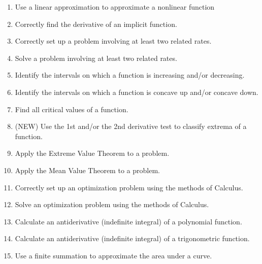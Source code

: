 \documentclass[12pt,landscape]{article}
\begin{document}
\begin{multicols}{2}
\begin{enumerate}
\item Use a linear approximation to approximate a nonlinear function\\
%
\item Correctly find the derivative of an implicit function.\\
\item Correctly set up a problem involving at least two related rates.\\
\item Solve a problem involving at least two related rates.\\
\item Identify the intervals on which a function is increasing and/or decreasing.\\
\item Identify the intervals on which a function is concave up and/or concave down.\\
\item Find all critical values of a function.\\
\item (NEW) Use the 1st and/or the 2nd derivative test to classify extrema of a function. \\
%
\item Apply the Extreme Value Theorem to a problem.\\
\item Apply the Mean Value Theorem to a problem.\\
\item Correctly set up an optimization problem using the methods of Calculus.\\
\item Solve an optimization problem using the methods of Calculus.\\
\item Calculate an antiderivative (indefinite integral) of a polynomial function.\\
\item Calculate an antiderivative (indefinite integral) of a trigonometric function.\\
%
\item Use a finite summation to approximate the area under a curve.\\

\end{enumerate}
\end{multicols}
\end{document}

